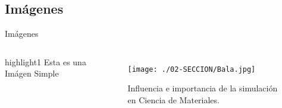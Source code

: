 \subsection{Imágenes}
\begin{frame}{Imágenes}
  \begin{columns}
    \begin{beamercolorbox}[ht=20pt,wd=\textwidth,center,colsep=5pt]{highlight1}
      \centering Esta es una Imágen Simple \par
    \end{beamercolorbox}
    \begin{figure}
      \texttt{[image: ./02-SECCION/Bala.jpg]}
      \caption{Influencia e importancia de la simulación en Ciencia de Materiales.}
    \end{figure}
  \end{columns}

\end{frame}

